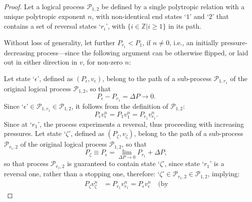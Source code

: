 \documentclass[fleqn,11pt]{SelfArx}
\begin{document}
    \begin{proof}
        Let a logical process $\mathcal{P}_{1,2}$ be defined by  a  single  polytropic  relation
        with a unique polytropic exponent $n$, with non-identical end  states  `$1$'  and  `$2$'
        that contains a set of reversal states `$r_i$', with $\{ i \in \mathbb{Z} | i  \geqslant
        1 \}$ in its path.

        Without loss of generality, let further $P_{r_1}  <  P_1$,  if  $n  \neq  0$,  i.e.,  an
        initially pressure-decreasing process---since the following argument  can  be  otherwise
        flipped, or laid out in either direction in $v$, for non-zero $n$:

        Let state `$\epsilon$', defined as $(P_{\epsilon}, v_{\epsilon})$, belong to the path of
        a sub-process $\mathcal{P}_{1,r_1}$ of the original logical process $\mathcal{P}_{1,2}$,
        so that
        \begin{equation}
            P_{\epsilon} - P_{r_1} = \Delta P \to 0.
            \label{eq:proof.Delta.P.epsi}
        \end{equation}
        Since  $\mbox{`}\epsilon\mbox{'}  \in  \mathcal{P}_{1,r_1}  \in  \mathcal{P}_{1,2}$,  it
        follows from the definition of $\mathcal{P}_{1,2}$:
        \begin{equation}
            P_{\epsilon}v_{\epsilon}^n = P_1v_1^n = P_{r_1}v_{r_1}^n.
            \label{eq:proof.Process.epsi}
        \end{equation}
        Since at `$r_1$', the process experiments a reversal, thus  proceeding  with  increasing
        pressures. Let state `$\zeta$', defined as $(P_{\zeta}, v_{\zeta})$, belong to the  path
        of   a   sub-process   $\mathcal{P}_{r_1,2}$   of   the   original    logical    process
        $\mathcal{P}_{1,2}$, so that
        \begin{equation}
            P_{\zeta} \equiv P_{\epsilon} = \lim_{\Delta P \to 0} P_{r_1} + \Delta P,
            \label{eq:proof.P.zeta}
        \end{equation}
        \noindent  so  that  process  $\mathcal{P}_{r_1,2}$  is  guaranteed  to  contain   state
        `$\zeta$', since state `$r_1$' is a reversal one, rather than a stopping one, therefore:
        $\mbox{`}\zeta\mbox{'} \in \mathcal{P}_{r_1,2} \in \mathcal{P}_{1,2}$, implying:
        \begin{align}
            P_{\zeta}v_{\zeta}^n & = P_{r_1}v_{r_1}^n = P_{\epsilon}v_{\epsilon}^n\quad\mbox{(by
}
\end{align}
\end{proof}
\end{document}
